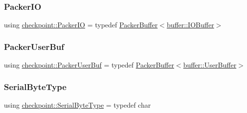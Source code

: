 \mbox{\label{namespacecheckpoint_a0c8b3f2f174fd1076b410c7a2128919b}} 
\subsubsection{\texorpdfstring{Packer\+IO}{PackerIO}}
{\footnotesize\ttfamily using \hyperlink{namespacecheckpoint_a0c8b3f2f174fd1076b410c7a2128919b}{checkpoint\+::\+Packer\+IO} = typedef \hyperlink{structcheckpoint_1_1_packer_buffer}{Packer\+Buffer}$<$\hyperlink{structcheckpoint_1_1buffer_1_1_i_o_buffer}{buffer\+::\+I\+O\+Buffer}$>$}

\mbox{\label{namespacecheckpoint_a72c31e3d94e3b4d05bca5972bacc536a}} 
\subsubsection{\texorpdfstring{Packer\+User\+Buf}{PackerUserBuf}}
{\footnotesize\ttfamily using \hyperlink{namespacecheckpoint_a72c31e3d94e3b4d05bca5972bacc536a}{checkpoint\+::\+Packer\+User\+Buf} = typedef \hyperlink{structcheckpoint_1_1_packer_buffer}{Packer\+Buffer}$<$\hyperlink{structcheckpoint_1_1buffer_1_1_user_buffer}{buffer\+::\+User\+Buffer}$>$}

\mbox{\label{namespacecheckpoint_ae57f01cdc0b81776c23b6c7c934c58f5}} 
\subsubsection{\texorpdfstring{Serial\+Byte\+Type}{SerialByteType}}
{\footnotesize\ttfamily using \hyperlink{namespacecheckpoint_ae57f01cdc0b81776c23b6c7c934c58f5}{checkpoint\+::\+Serial\+Byte\+Type} = typedef char}

\mbox{\label{namespacecheckpoint_ae8adefa66d7575697f8e465bed48e3cc}} 
